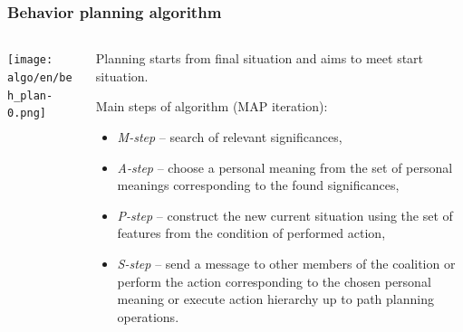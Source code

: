 \documentclass[default]{beamer}
\begin{document}
	\begin{frame}
		\frametitle{Behavior planning algorithm}
		
		\begin{columns}
			\begin{column}{0.7\textwidth}
				\texttt{[image: algo/en/beh\_plan-0.png]}
			\end{column}
			\begin{column}{0.3\textwidth}
				\tiny
				Planning starts from final situation and aims to meet start situation.
				\par\bigskip
				Main steps of algorithm (MAP iteration):
				\begin{itemize}
					\item \textit{M-step} -- search of relevant significances,
					\item \textit{A-step} -- choose a personal meaning from the set of personal meanings corresponding to the found significances,
					\item \textit{P-step} -- construct the new current situation using the set of features from the condition of performed action,
					\item \textit{S-step} -- send a message to other members of the coalition  or perform the action corresponding to the chosen personal meaning or execute action hierarchy up to \color{red} path planning operations.
				\end{itemize}
			\end{column}
		\end{columns}
		\nocite{*}
		\printbibliography[keyword={behplan}, resetnumbers=true]
	\end{frame}	
	
\end{document}
